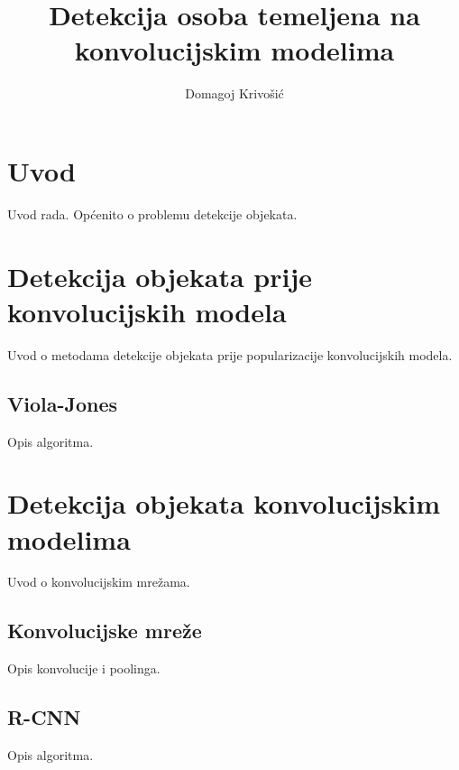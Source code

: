 \documentclass[times, utf8, diplomski]{fer}
\begin{document}

\title{Detekcija osoba temeljena na konvolucijskim modelima}

\author{Domagoj Krivošić}

\maketitle

\izvornik

\zahvala{}

\tableofcontents

\chapter{Uvod}
Uvod rada. Općenito o problemu detekcije objekata.

\chapter{Detekcija objekata prije konvolucijskih modela}
Uvod o metodama detekcije objekata prije popularizacije konvolucijskih modela.

\section{Viola-Jones}
Opis algoritma.

\chapter{Detekcija objekata konvolucijskim modelima}
Uvod o konvolucijskim mrežama.

\section{Konvolucijske mreže}
Opis konvolucije i poolinga.

\section{R-CNN}
Opis algoritma.
\end{document}
